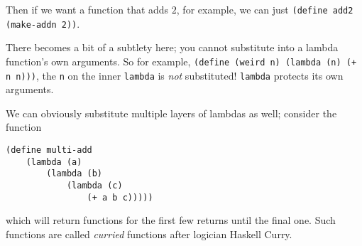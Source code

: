 \documentclass[10pt]{report}
\begin{document}
Then if we want a function that adds $2$, for example, we can just \texttt{(define add2 (make-addn 2))}.

There becomes a bit of a subtlety here; you cannot substitute into a lambda function's own arguments. So for example, \texttt{(define (weird n) (lambda (n) (+ n n)))}, the \texttt{n} on the inner \texttt{lambda} is \emph{not} substituted! \texttt{lambda} protects its own arguments.

We can obviously substitute multiple layers of lambdas as well; consider the function
\begin{verbatim}
(define multi-add
    (lambda (a)
        (lambda (b)
            (lambda (c)
                (+ a b c)))))
\end{verbatim}
which will return functions for the first few returns until the final one. Such functions are called \emph{curried} functions after logician Haskell Curry.
\end{document}
